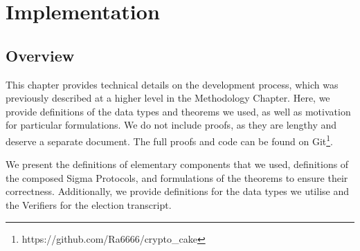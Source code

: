 \chapter{Implementation}
\section{Overview}
This chapter provides technical details on the development process, which was previously described at a 
higher level in the Methodology Chapter. Here, we provide definitions of the data types and theorems we 
used, as well as motivation for particular formulations. We do not include proofs, as they are lengthy 
and deserve a separate document. The full proofs and code can be found on 
Git\footnote{https://github.com/Ra6666/crypto_cake}.

We present the definitions of elementary components that we used, definitions 
of the composed Sigma Protocols, and formulations of the theorems to ensure their correctness. 
Additionally, we provide definitions for the data types we utilise and the Verifiers for the election 
transcript.

